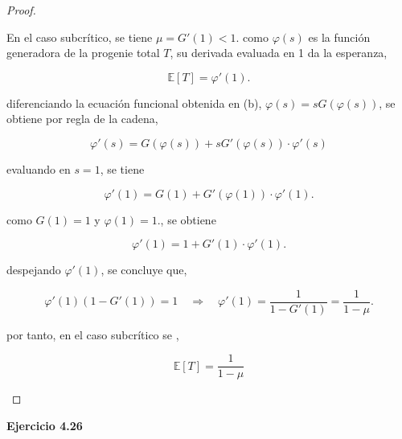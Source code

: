 \documentclass{article}
\begin{document}
\begin{proof}
\begin{itemize}
En el caso subcrítico, se tiene \( \mu = G'(1) < 1 \). como \( \varphi(s) \) es la función generadora de la progenie total \( T \), su derivada evaluada en 1 da la esperanza,

\[
\mathbb{E}[T] = \varphi'(1).
\]

diferenciando la ecuación funcional obtenida en (b), \( \varphi(s) = s G(\varphi(s)) \), se obtiene por regla de la cadena,

\[
\varphi'(s) = G(\varphi(s)) + s G'(\varphi(s)) \cdot \varphi'(s)
\]

evaluando en \( s = 1 \), se tiene

\[
\varphi'(1) = G(1) + G'(\varphi(1)) \cdot \varphi'(1).
\]

como \( G(1) = 1 \) y \( \varphi(1) = 1 \)., se obtiene

\[
\varphi'(1) = 1 + G'(1) \cdot \varphi'(1).
\]

despejando \( \varphi'(1) \), se concluye que,

\[
\varphi'(1) (1 - G'(1)) = 1 \quad \Rightarrow \quad \varphi'(1) = \frac{1}{1 - G'(1)} = \frac{1}{1 - \mu}.
\]

por tanto, en el caso subcrítico se ,

\[
\mathbb{E}[T] = \frac{1}{1 - \mu}
\]
\end{itemize}
\end{proof}
    

\textbf{Ejercicio 4.26}
\end{document}
